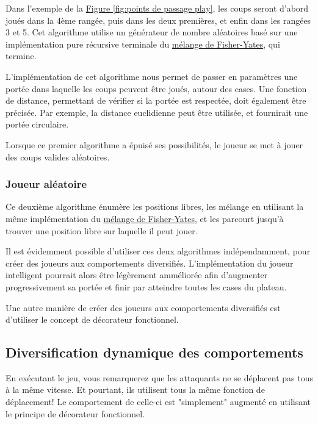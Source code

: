 \documentclass{article}
\begin{document}
Dans l'exemple de la \hyperref[fig:points de passage play]{Figure \ref{fig:points de passage play}}, les coups seront d'abord joués dans la 4ème rangée, puis dans les deux premières, et enfin dans les rangées 3 et 5.
Cet algorithme utilise un générateur de nombre aléatoires basé sur une implémentation pure récursive terminale du \hyperlink{https://fr.wikipedia.org/wiki/Mélange_de_Fisher-Yates}{mélange de Fisher-Yates}, qui termine.

L'implémentation de cet algorithme nous permet de passer en paramètres une portée dans laquelle les coups peuvent être joués, autour des cases.
Une fonction de distance, permettant de vérifier si la portée est respectée, doit également être précisée. Par exemple, la distance euclidienne peut être utilisée, et fournirait une portée circulaire.

Lorsque ce premier algorithme a épuisé ses possibilités, le joueur se met à jouer des coups valides aléatoires.

\subsubsection{Joueur aléatoire}

Ce deuxième algorithme énumère les positions libres, les mélange en utilisant la même implémentation du \hyperlink{https://fr.wikipedia.org/wiki/Mélange_de_Fisher-Yates}{mélange de Fisher-Yates}, et les parcourt jusqu'à trouver une position libre sur laquelle il peut jouer.

Il est évidemment possible d'utiliser ces deux algorithmes indépendamment, pour créer des joueurs aux comportements diversifiés. L'implémentation du joueur intelligent pourrait alors être légèrement amméliorée afin d'augmenter progressivement sa portée et finir par atteindre toutes les cases du plateau.

Une autre manière de créer des joueurs aux comportements diversifiés est d'utiliser le concept de décorateur fonctionnel.


\subsection{Diversification dynamique des comportements}

En exécutant le jeu, vous remarquerez que les attaquants ne se déplacent pas tous à la même vitesse. Et pourtant, ils utilisent tous la même fonction de déplacement! Le comportement de celle-ci est "simplement" augmenté en utilisant le principe de décorateur fonctionnel.  
\end{document}
